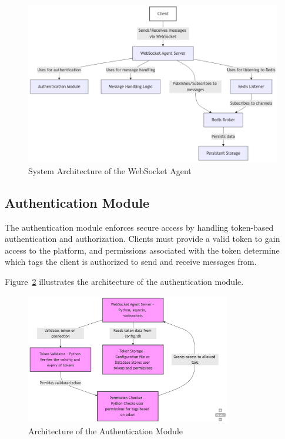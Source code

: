 \documentclass[a4paper, 11pt]{article}
\begin{document}
\begin{figure}
    \centering
    \includegraphics[width=\textwidth]{architecture.png}
    \caption{System Architecture of the WebSocket Agent}
    \label{fig:architecture}
\end{figure}

\subsection{Authentication Module}
The authentication module enforces secure access by handling token-based authentication and authorization. Clients must provide a valid token to gain access to the platform, and permissions associated with the token determine which tags the client is authorized to send and receive messages from. 

Figure~\ref{fig:auth_module} illustrates the architecture of the authentication module.

\begin{figure}[ht]
    \centering
    \includegraphics[width=0.8\textwidth]{auth.png} %
    \caption{Architecture of the Authentication Module}
    \label{fig:auth_module}
\end{figure}
\end{document}

